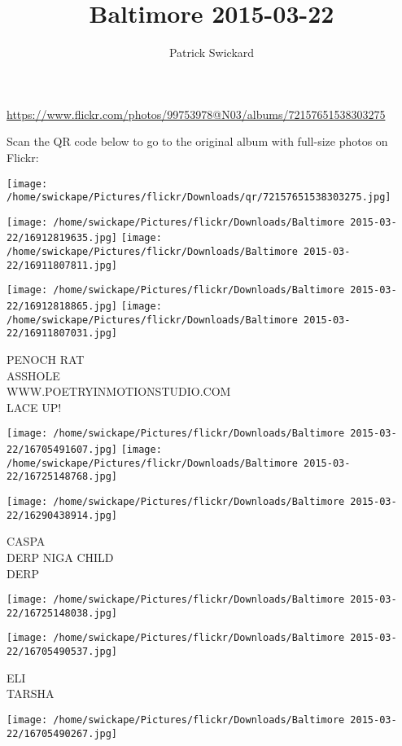 \documentclass[10pt,letterpaper]{article}
\title{Baltimore 2015-03-22}
\author{Patrick Swickard}
\date{}
\begin{document}
\maketitle

\url{https://www.flickr.com/photos/99753978@N03/albums/72157651538303275}

Scan the QR code below to go to the original album with full-size photos on Flickr:

\texttt{[image: /home/swickape/Pictures/flickr/Downloads/qr/72157651538303275.jpg]}
\pagebreak

\texttt{[image: /home/swickape/Pictures/flickr/Downloads/Baltimore 2015-03-22/16912819635.jpg]}
\texttt{[image: /home/swickape/Pictures/flickr/Downloads/Baltimore 2015-03-22/16911807811.jpg]}

\texttt{[image: /home/swickape/Pictures/flickr/Downloads/Baltimore 2015-03-22/16912818865.jpg]}
\texttt{[image: /home/swickape/Pictures/flickr/Downloads/Baltimore 2015-03-22/16911807031.jpg]}

PENOCH RAT\\
ASSHOLE\\
WWW.POETRYINMOTIONSTUDIO.COM\\
LACE UP!
\pagebreak

\texttt{[image: /home/swickape/Pictures/flickr/Downloads/Baltimore 2015-03-22/16705491607.jpg]}
\texttt{[image: /home/swickape/Pictures/flickr/Downloads/Baltimore 2015-03-22/16725148768.jpg]}

\vspace{0.25in}
\texttt{[image: /home/swickape/Pictures/flickr/Downloads/Baltimore 2015-03-22/16290438914.jpg]}

CASPA\\
DERP NIGA CHILD\\
DERP
\pagebreak

\texttt{[image: /home/swickape/Pictures/flickr/Downloads/Baltimore 2015-03-22/16725148038.jpg]}

\vspace{0.25in}
\texttt{[image: /home/swickape/Pictures/flickr/Downloads/Baltimore 2015-03-22/16705490537.jpg]}

ELI\\
TARSHA
\pagebreak

\texttt{[image: /home/swickape/Pictures/flickr/Downloads/Baltimore 2015-03-22/16705490267.jpg]}
\end{document}
